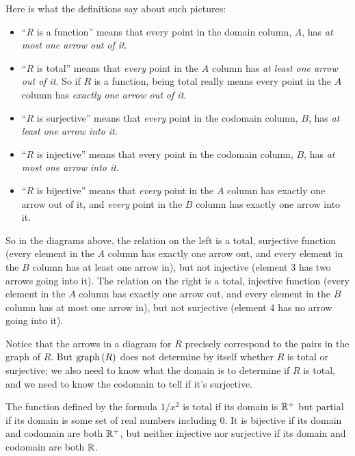Here is what the definitions say about such pictures:
\begin{itemize}

\item ``$R$ is a function'' means that every point in the domain column,
  $A$, has \emph{at most one arrow out of it}.

\item ``$R$ is total'' means that \emph{every} point in the $A$ column has
  \emph{at least one arrow out of it}.  So if $R$ is a function, being
  total really means every point in the $A$ column has
  \emph{exactly one arrow out of it}.

\item ``$R$ is surjective'' means that \emph{every} point in the codomain
  column, $B$, has \emph{at least one arrow into it}.

\item ``$R$ is injective'' means that every point in the codomain column,
  $B$, has \emph{at most one arrow into it}.

\item ``$R$ is bijective'' means that \emph{every} point in the $A$ column
      has exactly one arrow out of it, and \emph{every} point in the $B$ column
      has exactly one arrow into it.

\end{itemize}

So in the diagrams above, the relation on the left is a total, surjective
function (every element in the $A$ column has exactly one arrow out, and
every element in the $B$ column has at least one arrow in), but not
injective (element 3 has two arrows going into it).  The relation on the
right is a total, injective function (every element in the $A$ column has
exactly one arrow out, and every element in the $B$ column has at most one
arrow in), but not surjective (element 4 has no arrow going into it).

Notice that the arrows in a diagram for $R$ precisely correspond to the
pairs in the graph of $R$.  But $\mathop{\textup{graph}}\nolimits\left(R\right)$ does not determine by itself
whether $R$ is total or surjective; we also need to know what the domain
is to determine if $R$ is total, and we need to know the codomain to tell
if it's surjective.
\begin{example}
  The function defined by the formula $1/x^2$ is total if its domain is
  $\mathbb{R}^+$ but partial if its domain is some set of real numbers
  including 0.  It is bijective if its domain and codomain are both
  $\mathbb{R}^+$, but neither injective nor surjective if its domain and
  codomain are both $\mathbb{R}$.
\end{example}


